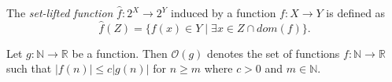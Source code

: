 \begin{definition}
  The \emph{set-lifted function} $\hat{f} : 2^X \rightarrow 2^Y$ induced by a
  function $f: X \rightarrow Y$ is defined as
  \begin{equation*}
    \hat{f}(Z) = \{ f(x) \in Y \mid \exists x \in Z \cap dom(f) \}.
  \end{equation*}
\end{definition}

\begin{definition}
  Let $g : \mathbb{N} \rightarrow \mathbb{R}$ be a function. Then $\mathcal{O}(g)$
  denotes the set of functions $f: \mathbb{N} \rightarrow \mathbb{R}$ such that
  $|f(n)| \leq c|g(n)|$ for $n \geq m$ where $c > 0$ and $m \in \mathbb{N}$.
\end{definition}
